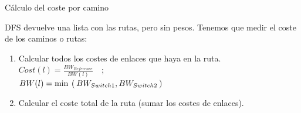 \documentclass[10pt,spanish,xcolor={svgnames}]{beamer}
\begin{document}
\begin{frame}{Cálculo del coste por camino}
\vspace*{-2em}
\begin{alertblock}{\large DFS devuelve una lista con las rutas, pero sin pesos.}
\vspace*{1em}
Tenemos que medir el coste de los caminos o rutas:
\begin{enumerate}
\item Calcular todos los costes de enlaces que haya en la ruta.\\ \vspace*{0.5em}  {\large $Cost(l) = \frac{BW_{Reference}}{BW(l)}\quad\mathrm{;}\quad$} 
\\ \vspace*{0.5em} {\large $BW(l) = \min\hspace{0.4em}(\hspace{0.2em}BW_{Switch1}, BW_{Switch2}\hspace{0.2em})$}
\vspace{1em}
\item Calcular el coste total de la ruta (sumar los costes de enlaces).
\end{enumerate}
\end{alertblock}
\end{frame}
\end{document}
